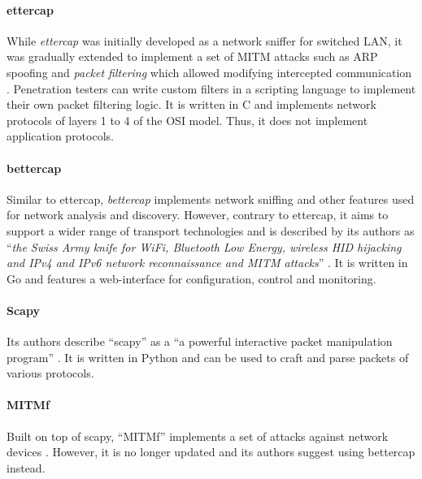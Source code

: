 \paragraph{ettercap} While \emph{ettercap} was initially developed as a network sniffer for switched \ac{LAN}, it was gradually extended to implement a set of \ac{MITM} attacks such as \ac{ARP} spoofing and \emph{packet filtering} which allowed modifying intercepted communication \cite{ettercap}. Penetration testers can write custom filters in a scripting language to implement their own packet filtering logic. It is written in C and implements network protocols of layers 1 to 4 of the \ac{OSI} model. Thus, it does not implement application protocols.
\paragraph{bettercap} Similar to ettercap, \emph{bettercap} implements network sniffing and other features used for network analysis and discovery. However, contrary to ettercap, it aims to support a wider range of transport technologies and is described by its authors as \enquote{\emph{the Swiss Army knife for WiFi, Bluetooth Low Energy, wireless HID hijacking and IPv4 and IPv6 network reconnaissance and MITM attacks}} \cite{bettercap}. It is written in Go and features a web-interface for configuration, control and monitoring.
\paragraph{Scapy} Its authors describe \enquote{scapy} as a \enquote{a powerful interactive packet manipulation program} \cite{scapy}. It is written in Python and can be used to craft and parse packets of various protocols.
\paragraph{MITMf} Built on top of scapy, \enquote{MITMf} implements a set of attacks against network devices \cite{mitmf}. However, it is no longer updated and its authors suggest using bettercap instead.